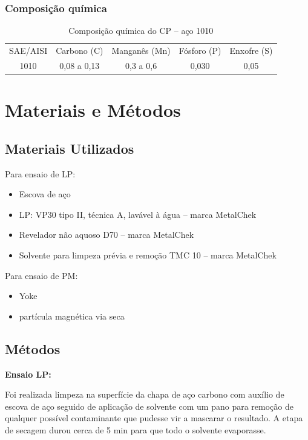 \documentclass[12pt,oneside]{article}
\begin{document}
\subsubsection{Composição química}

\begin{table}[H]
    \label{tab:composição}
    \centering
    \caption{Composição química do CP -- aço 1010}
    \begin{tabular}{ccccc}
        \toprule
        SAE/AISI & Carbono (C) & Manganês (Mn) & Fósforo (P) & Enxofre (S) \\
        1010 & 0,08 a 0,13 & 0,3 a 0,6 & 0,030 & 0,05 \\
        \bottomrule

    \end{tabular}
\end{table}

\section{Materiais e Métodos}

\subsection{Materiais Utilizados}
Para ensaio de LP:
\begin{itemize}
    \item Escova de aço
    \item LP: VP30 tipo II, técnica A, lavável à água -- marca MetalChek
    \item Revelador não aquoso D70 -- marca MetalChek
    \item Solvente para limpeza prévia e remoção TMC 10 -- marca MetalChek
\end{itemize}

Para ensaio de PM:
\begin{itemize}
    \item Yoke
    \item partícula magnética via seca
\end{itemize}


\subsection{Métodos}
\textbf{Ensaio LP:}

Foi realizada limpeza na superfície da chapa de aço carbono com auxílio de
escova de aço seguido de aplicação de solvente com um pano para remoção de
qualquer possível contaminante que pudesse vir a mascarar o resultado.
A etapa de secagem durou cerca de 5 min para que todo o solvente evaporasse.
\end{document}
